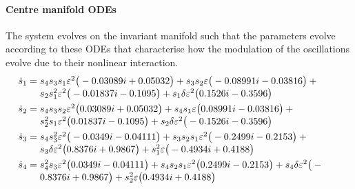 \paragraph{Centre manifold ODEs} 
The system evolves on the invariant manifold such that the
parameters evolve according to these ODEs that characterise
how the modulation of the oscillations evolve due to their
nonlinear interaction.
\begin{align*}&
\dot s_{1}=\ParMath{s_{4} s_{3} s_{1} \eps^{2} \big(-0.03089 i+0.05032\big)+s
_{3} s_{2} \eps \big(-0.08991 i-0.03816\big)+s_{2} s_{1}^{2} \eps^{2
} \big(-0.01837 i-0.1095\big)+s_{1} \delta  \eps^{2} \big(0.1526 i
-0.3596\big)}
\\&
\dot s_{2}=\ParMath{s_{4} s_{3} s_{2} \eps^{2} \big(0.03089 i+0.05032\big)+s_
{4} s_{1} \eps \big(0.08991 i-0.03816\big)+s_{2}^{2} s_{1} \eps^{2} 
\big(0.01837 i-0.1095\big)+s_{2} \delta  \eps^{2} \big(-0.1526 i-
0.3596\big)}
\\&
\dot s_{3}=\ParMath{s_{4} s_{3}^{2} \eps^{2} \big(-0.0349 i-0.04111\big)+s_{3
} s_{2} s_{1} \eps^{2} \big(-0.2499 i-0.2153\big)+s_{3} \delta  \eps
^{2} \big(0.8376 i+0.9867\big)+s_{1}^{2} \eps \big(-0.4934 i+
0.4188\big)}
\\&
\dot s_{4}=\ParMath{s_{4}^{2} s_{3} \eps^{2} \big(0.0349 i-0.04111\big)+s_{4}
 s_{2} s_{1} \eps^{2} \big(0.2499 i-0.2153\big)+s_{4} \delta  \eps^{
2} \big(-0.8376 i+0.9867\big)+s_{2}^{2} \eps \big(0.4934 i+
0.4188\big)}
\end{align*}


